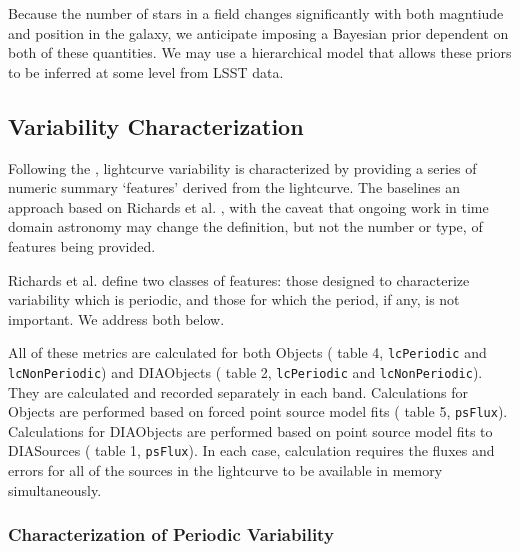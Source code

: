 Because the number of stars in a field changes significantly with both magntiude and position in the galaxy, we anticipate imposing a Bayesian prior dependent on both of these quantities.  We may use a hierarchical model that allows these priors to be inferred at some level from LSST data.

\subsection{Variability Characterization}
\label{sec:acVariabilityCharacterization}

Following the \DPDD{}, lightcurve variability is characterized by providing a series of numeric summary `features' derived from the lightcurve. The \DPDD baselines an approach based on Richards et al. \cite{2011ApJ...733...10R}, with the caveat that ongoing work in time domain astronomy may change the definition, but not the number or type, of features being provided.

Richards et al. define two classes of features: those designed to characterize variability which is periodic, and those for which the period, if any, is not important. We address both below.

All of these metrics are calculated for both Objects (\DPDD{} table 4, \texttt{lcPeriodic} and \texttt{lcNonPeriodic}) and DIAObjects (\DPDD{} table 2, \texttt{lcPeriodic} and \texttt{lcNonPeriodic}). They are calculated and recorded separately in each band. Calculations for Objects are performed based on forced point source model fits (\DPDD{} table 5, \texttt{psFlux}).  Calculations for DIAObjects are performed based on point source model fits to DIASources (\DPDD{} table 1, \texttt{psFlux}). In each case, calculation requires the fluxes and errors for all of the sources in the lightcurve to be available in memory simultaneously.

\subsubsection{Characterization of Periodic Variability}

